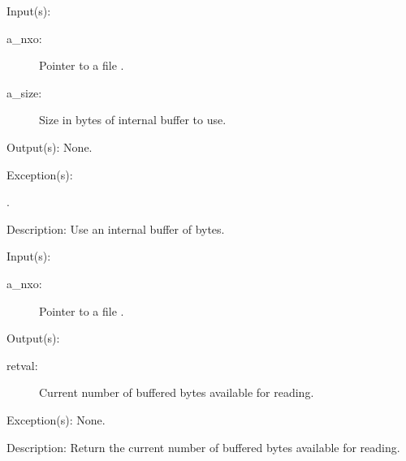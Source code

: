 \begin{capi}
\label{nxo_file_buffer_size_set}
	\begin{capilist}
	\item[Input(s): ]
		\begin{description}\item[]
		\item[a\_nxo: ]
			Pointer to a file .
		\item[a\_size: ]
			Size in bytes of internal buffer to use.
		\end{description}
	\item[Output(s): ] None.
	\item[Exception(s): ]
		\begin{description}\item[]
		\item[.]
		\end{description}
	\item[Description: ]
		Use an internal buffer of  bytes.
	\end{capilist}
\label{nxo_file_buffer_count}
	\begin{capilist}
	\item[Input(s): ]
		\begin{description}\item[]
		\item[a\_nxo: ]
			Pointer to a file \classname{nxo}.
		\end{description}
	\item[Output(s): ]
		\begin{description}\item[]
		\item[retval: ]
			Current number of buffered bytes available for reading.
		\end{description}
	\item[Exception(s): ] None.
	\item[Description: ]
		Return the current number of buffered bytes available for
		reading.
	\end{capilist}
\label{nxo_file_buffer_flush}
	\begin{capilist}

\end{capilist}
\end{capi}

